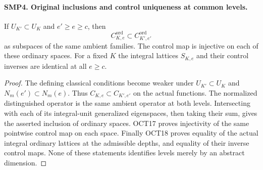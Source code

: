 \documentclass[11pt,a4paper]{article}
\numberwithin{equation}{section}
\theoremstyle{remark}\newtheorem{remark}[theorem]{Remark}
\begin{document}
\paragraph{SMP4. Original inclusions and control uniqueness at common levels.}
\label{claim:SMP4}
If $U_{K'}\subset U_K$ and $e'\geq e\geq c$, then
\[
 C^{\mathrm{ord}}_{K,\allowbreak{} e}\subset C^{\mathrm{ord}}_{K',\allowbreak{} e'}
\]
as subspaces of the same ambient families.  The control
map is injective on each of these ordinary spaces.
For a fixed $K$ the integral lattices $S_{K,\allowbreak{} e}$ and
their control inverses are identical at all $e\geq c$.
\begin{proof}
The defining classical conditions become weaker under
$U_{K'}\subset U_K$ and $N_m(e')\subset N_m(e)$.
Thus $C_{K,\allowbreak{} e}\subset C_{K',\allowbreak{} e'}$ on the actual
functions.  The normalized distinguished operator is
the same ambient operator at both levels.  Intersecting
with each of its integral-unit generalized eigenspaces,
then taking their sum, gives the asserted inclusion
of ordinary spaces.  OCT17 proves injectivity of the
same pointwise control map on each space.  Finally
OCT18 proves equality of the actual integral ordinary
lattices at the admissible depths, and equality of
their inverse control maps.  None of these statements
identifies levels merely by an abstract dimension.
\end{proof}

\end{document}
